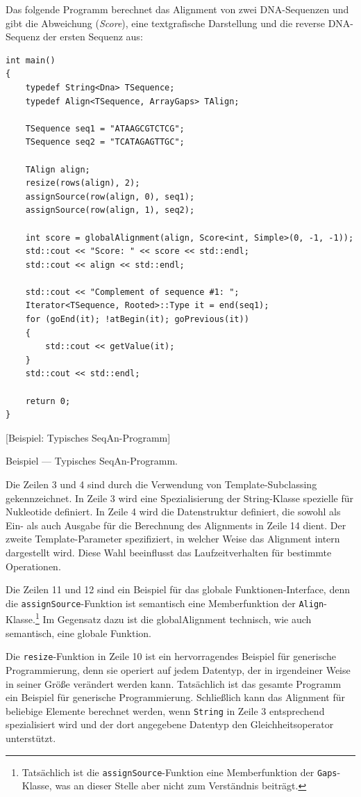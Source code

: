 \documentclass[11pt,a4paper]{book}
\begin{document}
Das folgende Programm berechnet das Alignment von zwei DNA-Sequenzen und gibt die Abweichung (\textit{Score}), eine textgrafische Darstellung und die reverse DNA-Sequenz der ersten Sequenz aus:

\begin{center}
\begin{verbatim}
int main()
{
    typedef String<Dna> TSequence;
    typedef Align<TSequence, ArrayGaps> TAlign;
    
    TSequence seq1 = "ATAAGCGTCTCG";
    TSequence seq2 = "TCATAGAGTTGC";

    TAlign align;
    resize(rows(align), 2);
    assignSource(row(align, 0), seq1);
    assignSource(row(align, 1), seq2);
    
    int score = globalAlignment(align, Score<int, Simple>(0, -1, -1));
    std::cout << "Score: " << score << std::endl;
    std::cout << align << std::endl;
    
    std::cout << "Complement of sequence #1: ";
    Iterator<TSequence, Rooted>::Type it = end(seq1);
    for (goEnd(it); !atBegin(it); goPrevious(it))
    {
        std::cout << getValue(it);
    }
    std::cout << std::endl;

    return 0;
}    
\end{verbatim}
[Beispiel: Typisches SeqAn-Programm]{Beispiel --- Typisches SeqAn-Programm.

Die Zeilen 3 und 4 sind durch die Verwendung von Template-Subclassing gekennzeichnet. In Zeile 3 wird eine Spezialisierung der String-Klasse spezielle für Nukleotide definiert. In Zeile 4 wird die Datenstruktur definiert, die sowohl als Ein- als auch Ausgabe für die Berechnung des Alignments in Zeile 14 dient. Der zweite Template-Parameter spezifiziert, in welcher Weise das Alignment intern dargestellt wird. Diese Wahl beeinflusst das Laufzeitverhalten für bestimmte Operationen.

Die Zeilen 11 und 12 sind ein Beispiel für das globale Funktionen-Interface, denn die \texttt{assignSource}-Funktion ist semantisch eine Memberfunktion der \texttt{Align}-Klasse.\footnote{Tatsächlich ist die \texttt{assignSource}-Funktion eine Memberfunktion der \texttt{Gaps}-Klasse, was an dieser Stelle aber nicht zum Verständnis beiträgt.} Im Gegensatz dazu ist die globalAlignment technisch, wie auch semantisch, eine globale Funktion.

Die \texttt{resize}-Funktion in Zeile 10 ist ein hervorragendes Beispiel für generische Programmierung, denn sie operiert auf jedem Datentyp, der in irgendeiner Weise in seiner Größe verändert werden kann. Tatsächlich ist das gesamte Programm ein Beispiel für generische Programmierung. Schließlich kann das Alignment für beliebige Elemente berechnet werden, wenn \texttt{String} in Zeile 3 entsprechend spezialisiert wird und der dort angegebene Datentyp den Gleichheitsoperator unterstützt.

}
\end{center}
\end{document}
